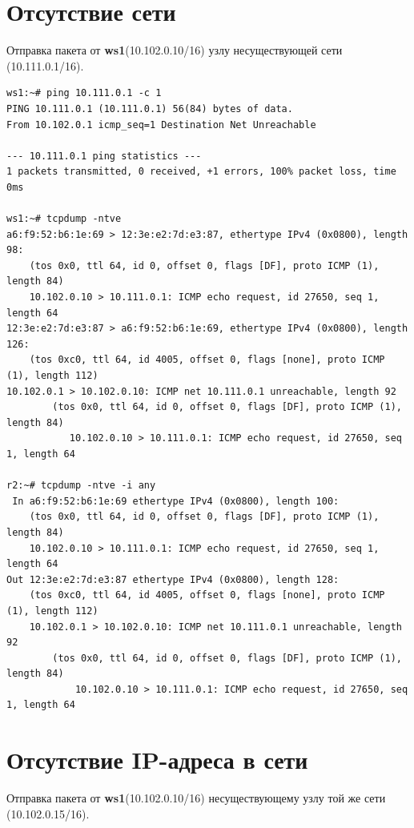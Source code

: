 \documentclass[a4paper,12pt]{article}
\begin{document}
\section{Отсутствие сети}

Отправка пакета от \textbf{ws1}(10.102.0.10/16) узлу несуществующей сети (10.111.0.1/16).

\begin{Verbatim}
ws1:~# ping 10.111.0.1 -c 1
PING 10.111.0.1 (10.111.0.1) 56(84) bytes of data.
From 10.102.0.1 icmp_seq=1 Destination Net Unreachable

--- 10.111.0.1 ping statistics ---
1 packets transmitted, 0 received, +1 errors, 100% packet loss, time 0ms

ws1:~# tcpdump -ntve
a6:f9:52:b6:1e:69 > 12:3e:e2:7d:e3:87, ethertype IPv4 (0x0800), length 98:
    (tos 0x0, ttl 64, id 0, offset 0, flags [DF], proto ICMP (1), length 84)
    10.102.0.10 > 10.111.0.1: ICMP echo request, id 27650, seq 1, length 64
12:3e:e2:7d:e3:87 > a6:f9:52:b6:1e:69, ethertype IPv4 (0x0800), length 126:
    (tos 0xc0, ttl 64, id 4005, offset 0, flags [none], proto ICMP (1), length 112)
10.102.0.1 > 10.102.0.10: ICMP net 10.111.0.1 unreachable, length 92
        (tos 0x0, ttl 64, id 0, offset 0, flags [DF], proto ICMP (1), length 84)
           10.102.0.10 > 10.111.0.1: ICMP echo request, id 27650, seq 1, length 64

r2:~# tcpdump -ntve -i any
 In a6:f9:52:b6:1e:69 ethertype IPv4 (0x0800), length 100:
    (tos 0x0, ttl 64, id 0, offset 0, flags [DF], proto ICMP (1), length 84)
    10.102.0.10 > 10.111.0.1: ICMP echo request, id 27650, seq 1, length 64
Out 12:3e:e2:7d:e3:87 ethertype IPv4 (0x0800), length 128:
    (tos 0xc0, ttl 64, id 4005, offset 0, flags [none], proto ICMP (1), length 112)
    10.102.0.1 > 10.102.0.10: ICMP net 10.111.0.1 unreachable, length 92
        (tos 0x0, ttl 64, id 0, offset 0, flags [DF], proto ICMP (1), length 84)
            10.102.0.10 > 10.111.0.1: ICMP echo request, id 27650, seq 1, length 64
\end{Verbatim}


\section{Отсутствие IP-адреса в сети}

Отправка пакета от \textbf{ws1}(10.102.0.10/16) несуществующему узлу той же сети (10.102.0.15/16).
\end{document}
